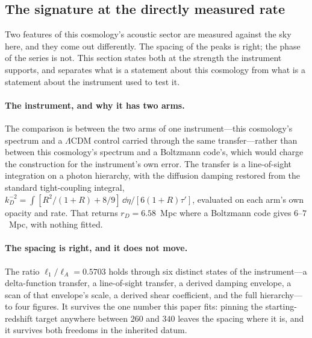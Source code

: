 \subsection{The signature at the directly measured rate}\label{sec:refit-bound}

Two features of this cosmology's acoustic sector are measured against the sky here, and they
come out differently. The spacing of the peaks is right; the phase of the series is not. This
section states both at the strength the instrument supports, and separates what is a statement
about this cosmology from what is a statement about the instrument used to test it.

\paragraph{The instrument, and why it has two arms.} The comparison is between the two arms of
one instrument---this cosmology's spectrum and a $\Lambda$CDM control carried through the same
transfer---rather than between this cosmology's spectrum and a Boltzmann code's, which would
charge the construction for the instrument's own error. The
transfer is a line-of-sight integration on a photon hierarchy, with the diffusion damping restored from the standard
tight-coupling integral, $k_D^{-2}=\int[R^{2}/(1+R)+8/9]\,\dd\eta/[6(1+R)\tau']$, evaluated on
each arm's own opacity and rate. That returns
$r_D=6.58$~Mpc where a Boltzmann code gives $6$--$7$~Mpc, with nothing
fitted.

\paragraph{The spacing is right, and it does not move.} The ratio
$\ell_{1}/\ell_{A}=0.5703$ holds through six distinct states of the instrument---a delta-function
transfer, a line-of-sight transfer, a derived damping envelope, a scan of that envelope's scale, a
derived shear coefficient, and the full hierarchy---to four
figures. It survives the one number
this paper fits: pinning the starting-redshift target anywhere between $260$ and $340$ leaves the
spacing where it is, and it
survives both freedoms in the inherited datum.

